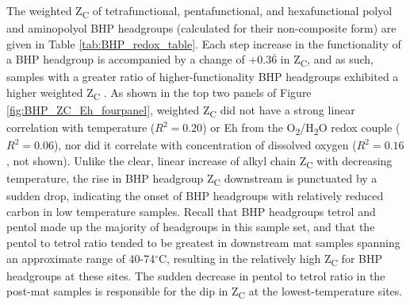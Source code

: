The weighted Z\textsubscript{C} of tetrafunctional, pentafunctional, and hexafunctional polyol and aminopolyol BHP headgroups (calculated for their non-composite form) are given in Table \ref{tab:BHP_redox_table}. Each step increase in the functionality of a BHP headgroup is accompanied by a change of +$0.3\overline{6}$ in Z\textsubscript{C}, and as such, samples with a greater ratio of higher-functionality BHP headgroups exhibited a higher weighted Z\textsubscript{C} . As shown in the top two panels of Figure \ref{fig:BHP_ZC_Eh_fourpanel}, weighted Z\textsubscript{C} did not have a strong linear correlation with temperature ($R^{2} = 0.20$) or Eh from the O\textsubscript{2}/H\textsubscript{2}O redox couple ($R^{2} = 0.06$), nor did it correlate with concentration of dissolved oxygen ($R^{2} = 0.16$, not shown). Unlike the clear, linear increase of alkyl chain Z\textsubscript{C} with decreasing temperature, the rise in BHP headgroup Z\textsubscript{C} downstream is punctuated by a sudden drop, indicating the onset of BHP headgroups with relatively reduced carbon in low temperature samples. Recall that BHP headgroups tetrol and pentol made up the majority of headgroups in this sample set, and that the pentol to tetrol ratio tended to be greatest in downstream mat samples spanning an approximate range of 40-74$^{\circ}$C, resulting in the relatively high Z\textsubscript{C} for BHP headgroups at these sites. The sudden decrease in pentol to tetrol ratio in the post-mat samples is responsible for the dip in Z\textsubscript{C} at the lowest-temperature sites.

